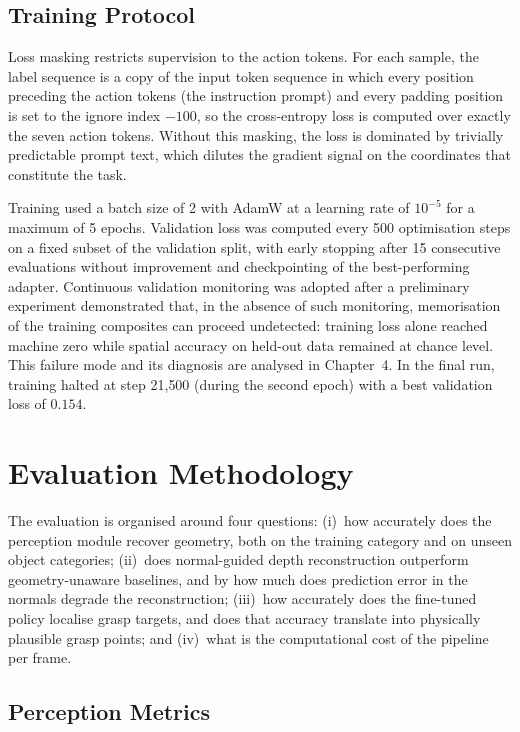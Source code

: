 \subsection{Training Protocol}
\label{subsec:training_protocol}

Loss masking restricts supervision to the action tokens. For each sample, the label sequence is a copy of the input token sequence in which every position preceding the action tokens (the instruction prompt) and every padding position is set to the ignore index $-100$, so the cross-entropy loss is computed over exactly the seven action tokens. Without this masking, the loss is dominated by trivially predictable prompt text, which dilutes the gradient signal on the coordinates that constitute the task.

Training used a batch size of 2 with AdamW at a learning rate of $10^{-5}$ for a maximum of 5 epochs. Validation loss was computed every 500 optimisation steps on a fixed subset of the validation split, with early stopping after 15 consecutive evaluations without improvement and checkpointing of the best-performing adapter. Continuous validation monitoring was adopted after a preliminary experiment demonstrated that, in the absence of such monitoring, memorisation of the training composites can proceed undetected: training loss alone reached machine zero while spatial accuracy on held-out data remained at chance level. This failure mode and its diagnosis are analysed in Chapter~4. In the final run, training halted at step 21{,}500 (during the second epoch) with a best validation loss of $0.154$.

\section{Evaluation Methodology}
\label{sec:eval_methodology}

The evaluation is organised around four questions: (i)~how accurately does the perception module recover geometry, both on the training category and on unseen object categories; (ii)~does normal-guided depth reconstruction outperform geometry-unaware baselines, and by how much does prediction error in the normals degrade the reconstruction; (iii)~how accurately does the fine-tuned policy localise grasp targets, and does that accuracy translate into physically plausible grasp points; and (iv)~what is the computational cost of the pipeline per frame.

\subsection{Perception Metrics}
\label{subsec:perception_metrics}

